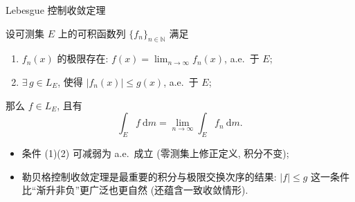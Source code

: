 \begin{frame}{Lebesgue 控制收敛定理}

\begin{thm}[控制收敛]
设可测集 $E$ 上的可积函数列 $\{f_n\}_{n \in \mathbb{N}}$ 满足
\begin{enumerate}
\item $f_n(x)$ 的极限存在: $f(x) = \lim_{n \to \infty} f_n(x)$, a.e.\ 于 $E$;
\item $\exists\, g \in L_E$, 使得 $|f_n(x)| \leqslant g(x)$, a.e.\ 于 $E$;
\end{enumerate}
那么 $f \in L_E$, 且有
\[
\int_E f ~ \mathrm{d} m = \lim_{n \to \infty} \int_E f_n ~ \mathrm{d} m .
\]
\end{thm}

\pause

\begin{itemize}
\item 条件 (1)(2) 可减弱为 a.e.\ 成立 (零测集上修正定义, 积分不变);
\item 勒贝格控制收敛定理是\alert{最重要的}积分与极限交换次序的结果:
  $|f| \leqslant g$ 这一条件比``渐升非负''更\alert{广泛}也更自然 (还蕴含一致收敛情形).
\end{itemize}

\end{frame}


